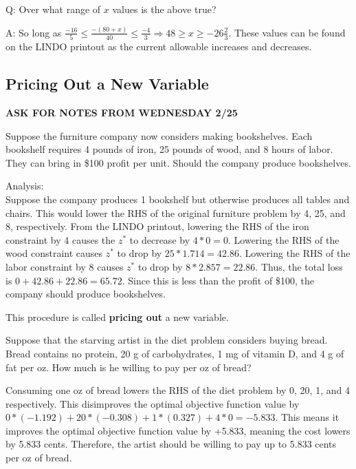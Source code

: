 \documentclass{article}
\begin{document}
Q: Over what range of \(x\) values is the above true?

A: So long as \(\frac{-16}{5} \leq \frac{-(80+x)}{40} \leq \frac{-4}{3}\Rightarrow 48 \geq x \geq -26 \frac{2}{3}\). These values 
can be found on the LINDO printout as the current allowable increases and decreases.

\subsection{Pricing Out a New Variable}

\textbf{ASK FOR NOTES FROM WEDNESDAY 2/25}

Suppose the furniture company now considers making bookshelves. Each bookshelf requires 
4 pounds of iron, 25 pounds of wood, and 8 hours of labor. They can bring in \$100 profit per unit. Should 
the company produce bookshelves.

Analysis: \\
Suppose the company produces 1 bookshelf but otherwise produces all tables and chairs. This would 
lower the RHS of the original furniture problem by 4, 25, and 8, respectively. From the LINDO printout, 
lowering the RHS of the iron constraint by 4 causes the \(z^*\) to decrease by \(4*0=0\). Lowering the RHS 
of the wood constraint causes \(z^*\) to drop by \(25*1.714=42.86\). Lowering the RHS of the labor constraint by 
8 causes \(z^*\) to drop by \(8*2.857=22.86\). Thus, the total loss is \(0+42.86+22.86=65.72\). Since this is less 
than the profit of \$100, the company should produce bookshelves. 

This procedure is called \textbf{pricing out} a new variable.

\begin{eg}
    Suppose that the starving artist in the diet problem considers buying bread. Bread contains 
    no protein, 20 g of carbohydrates, 1 mg of vitamin D, and 4 g of fat per oz. How much is he willing 
    to pay per oz of bread?
\end{eg}
\begin{answer}
    Consuming one oz of bread lowers the RHS of the diet problem by 0, 20, 1, and 4 respectively. 
    This disimproves the optimal objective function value by \(0*(-1.192)+20*(-0.308)+1*(0.327)+4*0=-5.833\). This means it improves the 
    optimal objective function value by +5.833, meaning the cost lowers by 5.833 cents. Therefore, the artist should be willing to pay 
    up to 5.833 cents per oz of bread. 
\end{answer}
\end{document}
